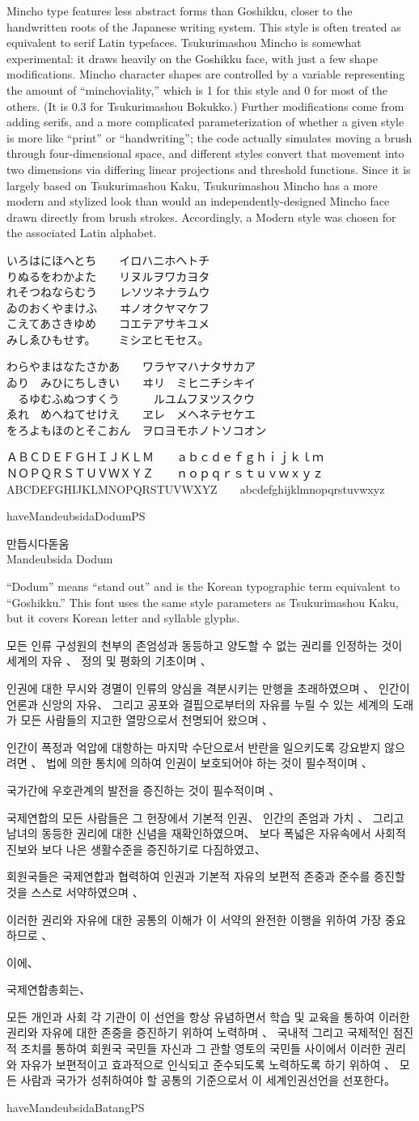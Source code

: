 \documentclass[14pt]{extarticle}
\newcommand{\iroha}{%
いろはにほへとち~~~~イロハニホヘトチ\\
りぬるをわかよた~~~~リヌルヲワカヨタ\\
れそつねならむう~~~~レソツネナラムウ\\
ゐのおくやまけふ~~~~ヰノオクヤマケフ\\
こえてあさきゆめ~~~~コエテアサキユメ\\
みしゑひもせす。~~~~ミシヱヒモセス。\par
}
\newcommand{\gojuuonzu}{%
わらやまはなたさかあ~~~~ワラヤマハナタサカア\\
ゐり~~みひにちしきい~~~~ヰリ~~ミヒニチシキイ\\
~~るゆむふぬつすくう~~~~~~ルユムフヌツスクウ\\
ゑれ~~めへねてせけえ~~~~ヱレ~~メヘネテセケエ\\
をろよもほのとそこおん~~ヲロヨモホノトソコオン\par
}
\newcommand{\undecl}{%
모든 인류 구성원의 천부의 존엄성과 동등하고 양도할 수 없는 권리를 인정하는
것이 세계의 자유 、 정의 및 평화의 기초이며 、

인권에 대한 무시와 경멸이 인류의 양심을 격분시키는 만행을 초래하였으며 、
인간이 언론과 신앙의 자유、 그리고 공포와 결핍으로부터의 자유를 누릴 수 있는
세계의 도래가 모든 사람들의 지고한 열망으로서 천명되어 왔으며 、

인간이 폭정과 억압에 대항하는 마지막 수단으로서 반란을 일으키도록 강요받지
않으려면 、 법에 의한 통치에 의하여 인권이 보호되어야 하는 것이 필수적이며 、

국가간에 우호관계의 발전을 증진하는 것이 필수적이며 、

국제연합의 모든 사람들은 그 헌장에서 기본적 인권、 인간의 존엄과 가치 、
그리고 남녀의 동등한 권리에 대한 신념을 재확인하였으며、 보다 폭넓은
자유속에서 사회적 진보와 보다 나은 생활수준을 증진하기로 다짐하였고、

회원국들은 국제연합과 협력하여 인권과 기본적 자유의 보편적 존중과 준수를
증진할 것을 스스로 서약하였으며 、

이러한 권리와 자유에 대한 공통의 이해가 이 서약의 완전한 이행을 위하여 가장
중요하므로 、

이에、

국제연합총회는、

모든 개인과 사회 각 기관이 이 선언을 항상 유념하면서 학습 및 교육을 통하여
이러한 권리와 자유에 대한 존중을 증진하기 위하여 노력하며 、 국내적 그리고
국제적인 점진적 조치를 통하여 회원국 국민들 자신과 그 관할 영토의 국민들
사이에서 이러한 권리와 자유가 보편적이고 효과적으로 인식되고 준수되도록
노력하도록 하기 위하여 、 모든 사람과 국가가 성취하여야 할 공통의 기준으로서
이 세계인권선언을 선포한다。 
\par
}
\begin{document}
Mincho type features less abstract forms than Goshikku, closer to the
handwritten roots of the Japanese writing system.  This style is often
treated as equivalent to serif Latin typefaces.  Tsukurimashou Mincho is
somewhat experimental: it draws heavily on the Goshikku face, with just a
few shape modifications.  Mincho character shapes are controlled by a
variable representing the amount of ``minchoviality,'' which is 1 for this
style and 0 for most of the others.  (It is 0.3 for Tsukurimashou Bokukko.)
Further modifications come from adding serifs, and a more complicated
parameterization of whether a given style is more like ``print'' or
``handwriting''; the code actually simulates moving a brush through
four-dimensional space, and different styles convert that movement into two
dimensions via differing linear projections and threshold functions. Since
it is largely based on Tsukurimashou Kaku, Tsukurimashou Mincho has a more
modern and stylized look than would an independently-designed Mincho face
drawn directly from brush strokes.  Accordingly, a Modern style was chosen
for the associated Latin alphabet.

\minchomono
\iroha
\gojuuonzu

ＡＢＣＤＥＦＧＨＩＪＫＬＭ~~~~ａｂｃｄｅｆｇｈｉｊｋｌｍ\\
ＮＯＰＱＲＳＴＵＶＷＸＹＺ~~~~ｎｏｐｑｒｓｔｕｖｗｘｙｚ\\
ABCDEFGHIJKLMNOPQRSTUVWXYZ~~~~abcdefghijklmnopqrstuvwxyz

\clearpage


\expandafter\ifx\csname haveMandeubsidaDodumPS\endcsname\relax\else

\dodum

\Large
만듭시다돋움\\
Mandeubsida Dodum

\normalsize

``Dodum'' means ``stand out'' and is the Korean typographic term equivalent
to ``Goshikku.''  This font uses the same style parameters as Tsukurimashou
Kaku, but it covers Korean letter and syllable glyphs.

\undecl

\clearpage

\fi


\expandafter\ifx\csname haveMandeubsidaBatangPS\endcsname\relax\else
\end{document}
